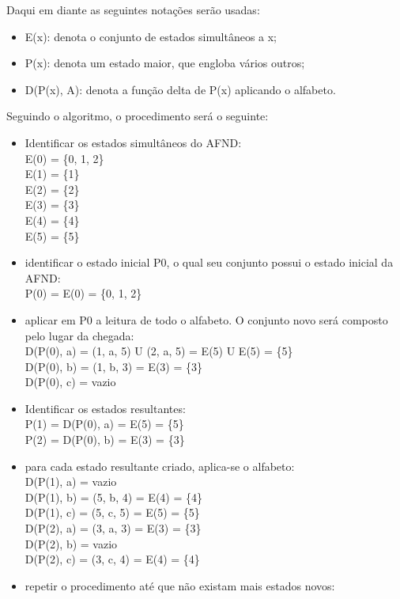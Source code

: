 \documentclass[a4paper,10pt]{article} %
\begin{document}
Daqui em diante as seguintes notações serão usadas:
    \begin{itemize}
        \item E(x): denota o conjunto de estados simultâneos a x;
        \item P(x): denota um estado maior, que engloba vários outros;
        \item D(P(x), A): denota a função delta de P(x) aplicando o alfabeto.
    \end{itemize}
    
Seguindo o algoritmo, o procedimento será o seguinte:
    \begin{itemize}
        \item Identificar os estados simultâneos do AFND:
            \\E(0) = \{0, 1, 2\}\\E(1) = \{1\}\\E(2) = \{2\}\\E(3) = \{3\}\\E(4) = \{4\}\\E(5) = \{5\}
        \item identificar o estado inicial P0, o qual seu conjunto possui o estado inicial da AFND:
            \\P(0) = E(0) = \{0, 1, 2\}
        \item aplicar em P0 a leitura de todo o alfabeto. O conjunto novo será composto pelo lugar da chegada:
            \\D(P(0), a) = (1, a, 5) U (2, a, 5) = E(5) U E(5) = \{5\}\\D(P(0), b) = (1, b, 3) = E(3) = \{3\}\\D(P(0), c) = vazio
        \item Identificar os estados resultantes:
            \\P(1) = D(P(0), a) = E(5) = \{5\}\\P(2) = D(P(0), b) = E(3) = \{3\}
        \item para cada estado resultante criado, aplica-se o alfabeto:
            \\D(P(1), a) = vazio\\D(P(1), b) = (5, b, 4) = E(4) = \{4\}\\D(P(1), c) = (5, c, 5) = E(5) = \{5\}
            \\D(P(2), a) = (3, a, 3) = E(3) = \{3\}\\D(P(2), b) = vazio\\D(P(2), c) = (3, c, 4) = E(4) = \{4\}
        \item repetir o procedimento até que não existam mais estados novos:

\end{itemize}
\end{document}
